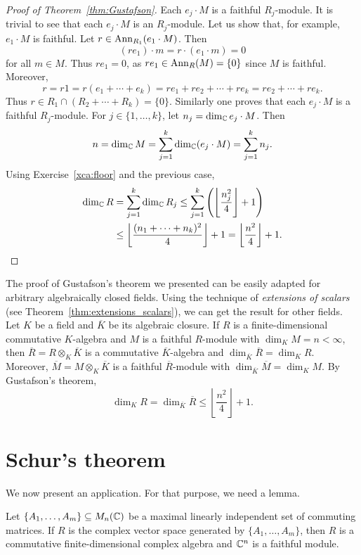 \begin{proof}[Proof of Theorem~\ref{thm:Gustafson}]
    Each $e_j\cdot M$ is a faithful $R_j$-module. It is trivial to see that each 
    $e_j\cdot M$ is an $R_j$-module. 
    Let us show that, for example, $e_1\cdot M$ is faithful. Let $r\in\operatorname{Ann}_{R_1}(e_1\cdot M)$. Then
    \[
    (re_1)\cdot m=r\cdot (e_1\cdot m)=0
    \]
    for all $m\in M$. Thus $re_1=0$, as $re_1\in\operatorname{Ann}_R(M)=\{0\}$ since $M$ is faithful. Moreover, 
    \[
    r=r1=r(e_1+\cdots+e_k)=re_1+re_2+\cdots+re_k=re_2+\cdots+re_k.
    \]
    Thus $r\in R_1\cap (R_2+\cdots+R_k)=\{0\}$. Similarly one proves that each $e_j\cdot M$ is a faithful $R_j$-module. 
    For $j\in\{1,\dots,k\}$, let $n_j=\dim_{\mathbb{C}}e_j\cdot M$. Then 
    \[
    n=\dim_{\mathbb{C}}M=\sum_{j=1}^k\dim_{\mathbb{C}}(e_j\cdot M)=\sum_{j=1}^kn_j.
    \]
    Using Exercise~\ref{xca:floor} and the previous case, 
    \begin{align*}
    \dim_{\mathbb{C}}R&=\sum_{j=1}^k\dim_{\mathbb{C}}R_j
    \leq\sum_{j=1}^k \left(\left\lfloor \frac{n_j^2}{4}\right\rfloor+1\right)\\
    &\leq\left\lfloor\frac{(n_1+\cdots+n_k)^2}{4}\right\rfloor+1
    =\left\lfloor\frac{n^2}{4}\right\rfloor+1.\qedhere     
    \end{align*}
\end{proof}

The proof of Gustafson's theorem we presented 
can be easily adapted for arbitrary algebraically closed fields. Using the technique of \emph{extensions 
of scalars} (see Theorem~\ref{thm:extensions_scalars}), 
we can get the result for other fields. Let $K$ be a field and $\overline{K}$ be its algebraic closure. 
If $R$ is a finite-dimensional commutative 
$K$-algebra and $M$ is a faithful $R$-module with $\dim_KM=n<\infty$, then 
$\overline{R}=R\otimes_K\overline{K}$ is a commutative $\overline{K}$-algebra and
$\dim_{\overline{K}}\overline{R}=\dim_KR$. Moreover, $\overline{M}=M\otimes_K\overline{K}$ is a faithful
$\overline{R}$-module with 
$\dim_{\overline{K}}\overline{M}=\dim_KM$. By Gustafson's theorem, 
\[
\dim_KR=\dim_{\overline{K}}\overline{R}\leq\left\lfloor\frac{n^2}{4}\right\rfloor+1.
\]

\section{Schur's theorem}

We now present an application. For that purpose, we need a lemma.

\begin{lemma}
\label{lem:Gustafson}
    Let $\{A_1,\dots,A_m\}\subseteq M_n(\mathbb{C})$ be a maximal linearly independent set of
    commuting matrices. If $R$ is the complex vector space
    generated by $\{A_1,\dots,A_m\}$, then $R$ 
    is a commutative finite-dimensional complex 
    algebra and $\mathbb{C}^n$ is a faithful module. 
\end{lemma}

